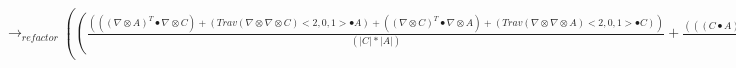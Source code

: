 \documentclass{article}
\begin{document}
\newline $\rightarrow_{refactor}(( \frac{((( \nabla  \otimes A)^T \bullet  \nabla  \otimes C)+(Trav( \nabla  \otimes  \nabla  \otimes C)<2,0,1> \bullet A)+(( \nabla  \otimes C)^T \bullet  \nabla  \otimes A)+(Trav( \nabla  \otimes  \nabla  \otimes A)<2,0,1> \bullet C))}{(|C|*|A|)}+ \frac{(((C \bullet A)*((A \bullet  \nabla  \otimes A) \otimes (A \bullet  \nabla  \otimes A)))+(2*(C \bullet A)*((A \bullet  \nabla  \otimes A) \otimes (A \bullet  \nabla  \otimes A))))}{(|A|*|C|*((A \bullet A))^2)}+ \frac{((((C \bullet A)*((A \bullet  \nabla  \otimes A)*(C \bullet  \nabla  \otimes C))))^T+((C \bullet A)*((A \bullet  \nabla  \otimes A) \otimes (C \bullet  \nabla  \otimes C))))}{((C \bullet C)*|A|*|C|*(A \bullet A))}+ \frac{((C \bullet A)*((C \bullet  \nabla  \otimes C) \otimes (C \bullet  \nabla  \otimes C)))}{(|C|*|A|*((C \bullet C))^2)}+ \frac{(2*|C|*(C \bullet A)*((C \bullet  \nabla  \otimes C) \otimes (C \bullet  \nabla  \otimes C)))}{(|A|*(C \bullet C)*((C \bullet C))^2)})-( \frac{((((((((( \nabla  \otimes C)^T \bullet A) \otimes (A \bullet  \nabla  \otimes A)))+((C \bullet A)*(A \bullet  \nabla  \otimes  \nabla  \otimes A)))+((C \bullet A)*(( \nabla  \otimes A)^T \bullet  \nabla  \otimes A)))+((((( \nabla  \otimes C)^T \bullet A)*(A \bullet  \nabla  \otimes A))))^T)+((((C \bullet  \nabla  \otimes A)*(A \bullet  \nabla  \otimes A))))^T)+(((C \bullet  \nabla  \otimes A) \otimes (A \bullet  \nabla  \otimes A))))}{(|C|*|A|*(A \bullet A))}+ \frac{(((((((( \nabla  \otimes C)^T \bullet A)*(C \bullet  \nabla  \otimes C))))^T+(((( \nabla  \otimes C)^T \bullet A) \otimes (C \bullet  \nabla  \otimes C))))+((((C \bullet  \nabla  \otimes A)*(C \bullet  \nabla  \otimes C))))^T)+(((( \nabla  \otimes A)^T \bullet C) \otimes (C \bullet  \nabla  \otimes C))))}{(|A|*|C|*(C \bullet C))}+ \frac{((|C|*(C \bullet A)*(( \nabla  \otimes C)^T \bullet  \nabla  \otimes C))+(|C|*(C \bullet A)*(C \bullet  \nabla  \otimes  \nabla  \otimes C)))}{(|A|*(C \bullet C)*(C \bullet C))}))$
\end{document}
